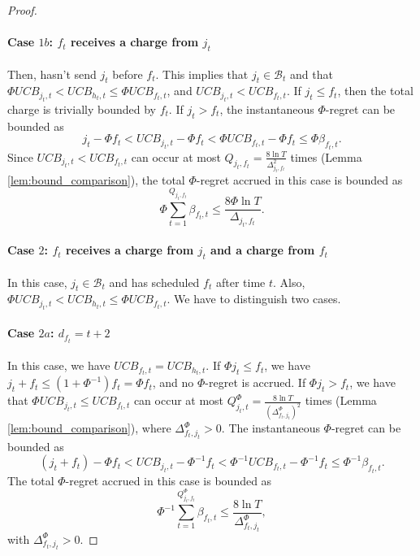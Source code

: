 \begin{proof}
    \paragraph{Case $1b$: $f_t$ receives a charge from $j_t$} Then, \alg hasn't send $j_t$ before $f_t$. This implies that $j_t \in \mathcal{B}_t$ and that $\Phi UCB_{j_t,t} < UCB_{h_t,t} \le \Phi UCB_{f_t,t}$, and $UCB_{j_t,t} < UCB_{f_t,t}$. If $j_t \le f_t$, then the total charge is trivially bounded by $f_t$. If $j_t > f_t$, the instantaneous $\Phi$-regret can be bounded as
    $$
    j_t - \Phi f_t < UCB_{j_t,t} - \Phi f_t< \Phi UCB_{f_t,t} - \Phi f_t\le \Phi \beta_{f_t,t}.
    $$
    Since $UCB_{j_t,t} < UCB_{f_t,t}$ can occur at most $Q_{j_t,f_t}= \frac{8\ln T}{\Delta_{j_t,f_t}^2}$ times (Lemma \ref{lem:bound_comparison}), the total $\Phi$-regret accrued in this case is bounded as
    $$
    \Phi \sum_{t=1}^{Q_{j_t,f_t}} \beta_{f_t,t} \le \frac{8\Phi \ln T}{\Delta_{j_t,f_t}}.
    $$
    \paragraph{Case $2$: $f_t$ receives a charge from $j_t$ and a charge from $f_t$} In this case, $j_t \in \mathcal{B}_t$ and \opt has scheduled $f_t$ after time $t$. Also, $\Phi UCB_{j_t,t} < UCB_{h_t,t} \le \Phi UCB_{f_t,t}$. We have to distinguish two cases.
    \paragraph{Case $2a$: $d_{f_t}=t+2$} In this case, we have $UCB_{f_t,t}=UCB_{h_t,t}$. If $\Phi j_t \leq f_t$, we have $j_t+f_t \le \left(1+\Phi^{-1}\right)f_t = \Phi f_t$, and no $\Phi$-regret is accrued. If $\Phi j_t > f_t$, we have that $\Phi UCB_{j_t,t} \le UCB_{f_t,t}$ can occur at most $Q_{j_t,t}^\Phi = \frac{8\ln T}{\left(\Delta_{f_t,j_t}^\Phi\right)^2}$ times (Lemma \ref{lem:bound_comparison}), where $\Delta_{f_t,j_t}^\Phi > 0$. The instantaneous $\Phi$-regret can be bounded as
    $$
    (j_t + f_t) - \Phi f_t< UCB_{j_t,t} - \Phi^{-1} f_t < \Phi^{-1}UCB_{f_t,t} - \Phi^{-1} f_t \le \Phi^{-1} \beta_{f_t,t}.
    $$
    The total $\Phi$-regret accrued in this case is bounded as
    $$
    \Phi^{-1} \sum_{t=1}^{Q_{j_t,f_t}^{\Phi}} \beta_{f_t,t} \le \frac{8\ln T}{\Delta_{f_t,j_t}^\Phi},
    $$
    with $\Delta_{f_t,j_t}^\Phi > 0$.

\end{proof}

